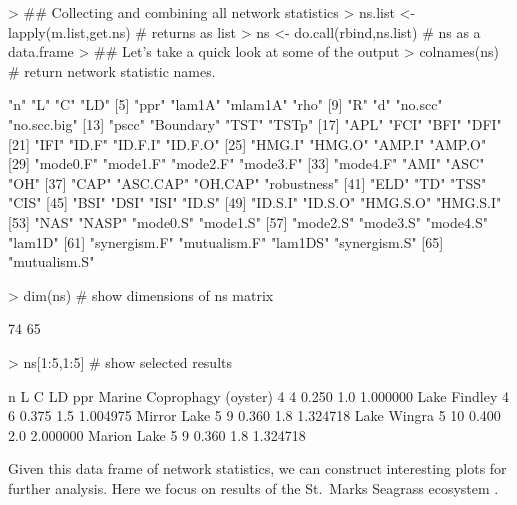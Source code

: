 \documentclass[article]{jss}
\begin{document}
\begin{Schunk}
\begin{Sinput}
> ## Collecting and combining all network statistics
> ns.list <- lapply(m.list,get.ns) # returns as list
> ns <- do.call(rbind,ns.list)  # ns as a data.frame
> ## Let's take a quick look at some of the output
> colnames(ns)    # return network statistic names.
\end{Sinput}
\begin{Soutput}
 [1] "n"           "L"           "C"           "LD"         
 [5] "ppr"         "lam1A"       "mlam1A"      "rho"        
 [9] "R"           "d"           "no.scc"      "no.scc.big" 
[13] "pscc"        "Boundary"    "TST"         "TSTp"       
[17] "APL"         "FCI"         "BFI"         "DFI"        
[21] "IFI"         "ID.F"        "ID.F.I"      "ID.F.O"     
[25] "HMG.I"       "HMG.O"       "AMP.I"       "AMP.O"      
[29] "mode0.F"     "mode1.F"     "mode2.F"     "mode3.F"    
[33] "mode4.F"     "AMI"         "ASC"         "OH"         
[37] "CAP"         "ASC.CAP"     "OH.CAP"      "robustness" 
[41] "ELD"         "TD"          "TSS"         "CIS"        
[45] "BSI"         "DSI"         "ISI"         "ID.S"       
[49] "ID.S.I"      "ID.S.O"      "HMG.S.O"     "HMG.S.I"    
[53] "NAS"         "NASP"        "mode0.S"     "mode1.S"    
[57] "mode2.S"     "mode3.S"     "mode4.S"     "lam1D"      
[61] "synergism.F" "mutualism.F" "lam1DS"      "synergism.S"
[65] "mutualism.S"
\end{Soutput}
\begin{Sinput}
> dim(ns)         # show dimensions of ns matrix
\end{Sinput}
\begin{Soutput}
[1] 74 65
\end{Soutput}
\begin{Sinput}
> ns[1:5,1:5]     # show selected results
\end{Sinput}
\begin{Soutput}
                           n  L     C  LD      ppr
Marine Coprophagy (oyster) 4  4 0.250 1.0 1.000000
Lake Findley               4  6 0.375 1.5 1.004975
Mirror Lake                5  9 0.360 1.8 1.324718
Lake Wingra                5 10 0.400 2.0 2.000000
Marion Lake                5  9 0.360 1.8 1.324718
\end{Soutput}
\end{Schunk}

Given this data frame of network statistics, we can construct
interesting plots for further analysis. Here we focus on results of
the St.\ Marks Seagrass ecosystem \citep{baird98}.
\end{document}

